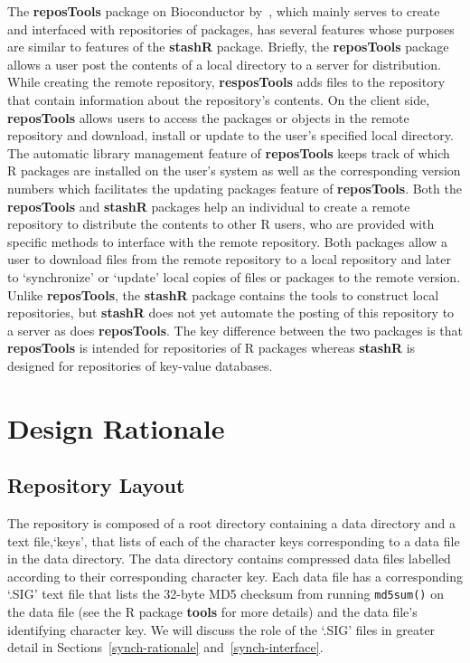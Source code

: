 \documentclass{article}
\newcommand{\pkg}{\textbf}
\newcommand{\code}{\texttt}
\begin{document}
The \pkg{reposTools} package on Bioconductor by~\cite{reposTools}, which 
mainly serves to create and interfaced with repositories of packages, has
several features whose purposes are similar to features of the \pkg{stashR} 
package.  Briefly, the \pkg{reposTools} package allows a user post the contents of
a local directory to a server for distribution. While creating the remote
repository, \pkg{resposTools} adds files to the repository that contain 
information about the repository's contents. On the client side, 
\pkg{reposTools} allows users to access the packages or objects in the
remote repository and download, install or update to the user's specified
local directory. The automatic library management feature of \pkg{reposTools}
keeps track of which R packages are installed on the user's system as well
as the corresponding version numbers which facilitates the updating 
packages feature of \pkg{reposTools}.  Both the \pkg{reposTools} and \pkg{stashR}
packages help an individual to create a remote repository to
distribute the contents to other R users, who are provided with
specific methods to interface with the remote repository. Both packages
allow a user to download files from the remote repository to a local
repository and later to `synchronize' or `update' local copies of
files or packages to the remote version. Unlike \pkg{reposTools}, 
the \pkg{stashR} package contains the tools to construct local repositories, 
but \pkg{stashR} does not yet automate the posting of this repository to 
a server as does \pkg{reposTools}. The key difference between the two 
packages is that \pkg{reposTools} is intended for repositories 
of R packages whereas \pkg{stashR} is designed for repositories of 
key-value databases.
 





\section{Design Rationale}


\subsection{Repository Layout} \label{layout}

The repository is composed of a root directory containing a data directory and
a text file,`keys', that lists of each of the character keys corresponding
to a data file in the data directory. The data directory contains compressed
data files labelled according to their corresponding character key. Each data file
has a corresponding `.SIG' text file that lists the 32-byte MD5 checksum from 
running \code{md5sum()} on the data file (see the R package \pkg{tools} for more 
details) and the data file's identifying character key. We will discuss the role 
of the `.SIG' files in greater detail in Sections~\ref{synch-rationale} 
and~\ref{synch-interface}. 
 
\end{document}
